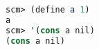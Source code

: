 \begin{lstlisting}[language=Scheme]
scm> (define a 1)
a
scm> '(cons a nil)
(cons a nil)
\end{lstlisting}

